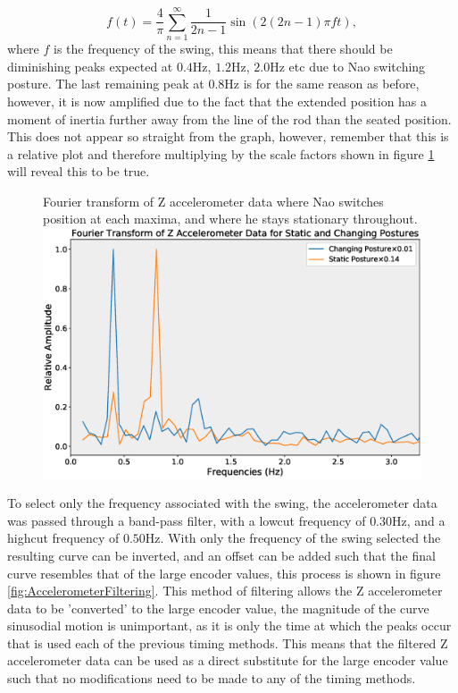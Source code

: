 \documentclass[11pt]{article}
\begin{document}
\begin{equation}
    f(t) = \frac{4}{\pi}\sum_{n=1}^{\infty} \frac{1}{2n-1}\sin(2(2n-1)\pi ft),
\end{equation}
where $f$ is the frequency of the swing, this means that there should be diminishing peaks expected at $0.4$Hz, $1.2$Hz, $2.0$Hz etc due to Nao switching posture. The last remaining peak at $0.8$Hz is for the same reason as before, however, it is now amplified due to the fact that the extended position has a moment of inertia further away from the line of the rod than the seated position. This does not appear so straight from the graph, however, remember that this is a relative plot and therefore multiplying by the scale factors shown in figure \ref{fig:FrequencyDecomposition} will reveal this to be true.\\

    \begin{figure}[!htb]
        \centering
        \captionbox
             {Fourier transform of Z accelerometer data where Nao switches position at each maxima, and where he stays stationary throughout.\label{fig:FrequencyDecomposition}}
             {\includegraphics[width=1.0\textwidth]{FrequencyDecomposition.eps}}
    \end{figure}

To select only the frequency associated with the swing, the accelerometer data was passed through a band-pass filter, with a lowcut frequency of $0.30$Hz, and a highcut frequency of $0.50$Hz. With only the frequency of the swing selected the resulting curve can be inverted, and an offset can be added such that the final curve resembles that of the large encoder values, this process is shown in figure \ref{fig:AccelerometerFiltering}. This method of filtering allows the Z accelerometer data to be 'converted' to the large encoder value, the magnitude of the curve sinusodial motion is unimportant, as it is only the time at which the peaks occur that is used each of the previous timing methods. This means that the filtered Z accelerometer data can be used as a direct substitute for the large encoder value such that no modifications need to be made to any of the timing methods.\\
\end{document}
